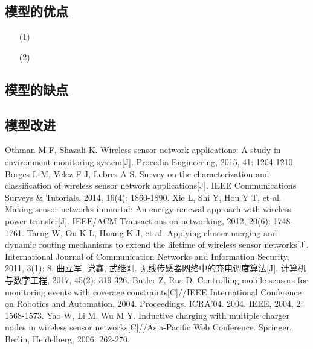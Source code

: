 \documentclass{whutmod}
\begin{document}
		\subsection{模型的优点}
			\begin{itemize}                                             
			\item [(1)]
			\item [(2)] 	
			\end{itemize}
		\subsection{模型的缺点}

  		\subsection{模型改进}

  
  
 
	\newpage	%
	\nocite{*}		%
	\begin{thebibliography}{9}%
		Othman M F, Shazali K. Wireless sensor network applications: A study in environment monitoring system[J]. Procedia Engineering, 2015, 41: 1204-1210.
		Borges L M, Velez F J, Lebres A S. Survey on the characterization and classification of wireless sensor network applications[J]. IEEE Communications Surveys \& Tutorials, 2014, 16(4): 1860-1890.
		Xie L, Shi Y, Hou Y T, et al. Making sensor networks immortal: An energy-renewal approach with wireless power transfer[J]. IEEE/ACM Transactions on networking, 2012, 20(6): 1748-1761.
		Tarng W, Ou K L, Huang K J, et al. Applying cluster merging and dynamic routing mechanisms to extend the lifetime of wireless sensor networks[J]. International Journal of Communication Networks and Information Security, 2011, 3(1): 8.
		曲立军, 党鑫, 武继刚. 无线传感器网络中的充电调度算法[J]. 计算机与数字工程, 2017, 45(2): 319-326.
		Butler Z, Rus D. Controlling mobile sensors for monitoring events with coverage constraints[C]//IEEE International Conference on Robotics and Automation, 2004. Proceedings. ICRA'04. 2004. IEEE, 2004, 2: 1568-1573.
		Yao W, Li M, Wu M Y. Inductive charging with multiple charger nodes in wireless sensor networks[C]//Asia-Pacific Web Conference. Springer, Berlin, Heidelberg, 2006: 262-270.
	
	\end{thebibliography}
\end{document}
